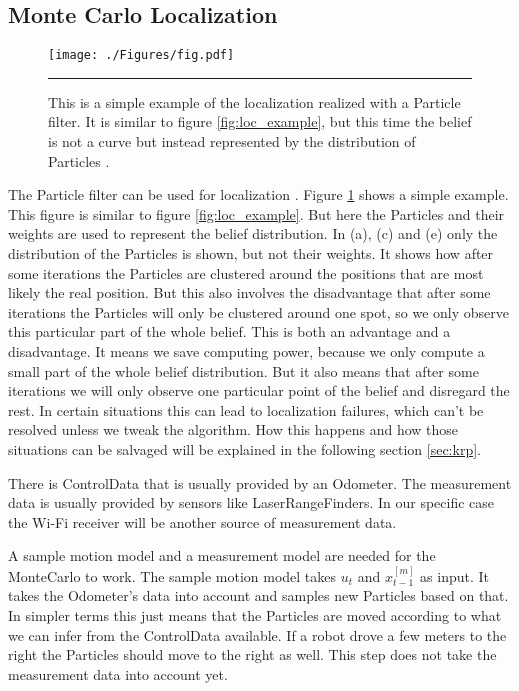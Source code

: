 \subsection{Monte Carlo Localization}\label{sec:montecarlo}
\begin{figure}[htbp]
	\centering
		\texttt{[image: ./Figures/fig.pdf]}
		\rule{35em}{0.5pt}
	\caption[Simple example of localization with \gls{Particle} filter]{This is a simple example of the localization realized with a \gls{Particle} filter. It is similar to figure \ref{fig:loc_example}, but this time the belief is not a curve but instead represented by the distribution of \gls{Particle}s \citep[p.\ 251]{Thrun:2005:PR:1121596}.}
	\label{fig:particle_localization}
\end{figure}
The \gls{Particle} filter can be used for localization \citep[p.\ 252]{Thrun:2005:PR:1121596}. Figure \ref{fig:particle_localization} shows a simple example. This figure is similar to figure \ref{fig:loc_example}. But here the \gls{Particle}s and their weights are used to represent the belief distribution. In (a), (c) and (e) only the distribution of the \gls{Particle}s is shown, but not their weights. It shows how after some iterations the \gls{Particle}s are clustered around the positions that are most likely the real position. But this also involves the disadvantage that after some iterations the \gls{Particle}s will only be clustered around one spot, so we only observe this particular part of the whole belief. This is both an advantage and a disadvantage. It means we save computing power, because we only compute a small part of the whole belief distribution. But it also means that after some iterations we will only observe one particular point of the belief and disregard the rest. In certain situations this can lead to localization failures, which can't be resolved unless we tweak the algorithm. How this happens and how those situations can be salvaged will be explained in the following section \ref{sec:krp}.

There is \gls{ControlData} that is usually provided by an \gls{Odometer}. The measurement data is usually provided by sensors like \glspl{LaserRangeFinder}. In our specific case the Wi-Fi receiver will be another source of measurement data. 

A sample motion model and a measurement model are needed for the \Gls{MonteCarlo} to work. The sample motion model takes $u_t$ and $x_{t-1}^{[m]}$ as input. It takes the \gls{Odometer}'s data into account and samples new \gls{Particle}s based on that. In simpler terms this just means that the \gls{Particle}s are moved according to what we can infer from the \gls{ControlData} available. If a robot drove a few meters to the right the \gls{Particle}s should move to the right as well. This step does not take the measurement data into account yet.

